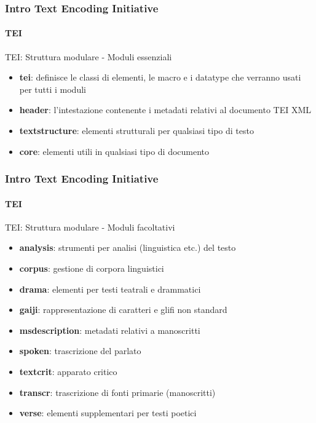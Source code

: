 \begin{frame}
	\frametitle{Intro Text Encoding Initiative}
	\framesubtitle{TEI}
	\addtocounter{nframe}{1}

	\begin{block}{TEI: Struttura modulare - Moduli essenziali}
		\begin{itemize}
			\item \textbf{tei}: definisce le classi di elementi, le macro e i datatype che verranno usati per tutti i moduli
			\item \textbf{header}: l’intestazione contenente i metadati relativi al documento TEI XML
			\item \textbf{textstructure}: elementi strutturali per qualsiasi tipo di testo
			\item \textbf{core}: elementi utili in qualsiasi tipo di documento
		\end{itemize}

	\end{block}

\end{frame}

\begin{frame}
	\frametitle{Intro Text Encoding Initiative}
	\framesubtitle{TEI}
	\addtocounter{nframe}{1}

	\begin{block}{TEI: Struttura modulare - Moduli facoltativi}
		\begin{itemize}
			\item \textbf{analysis}: strumenti per analisi (linguistica etc.) del testo
			\item \textbf{corpus}: gestione di corpora linguistici
			\item \textbf{drama}: elementi per testi teatrali e drammatici
			\item \textbf{gaiji}: rappresentazione di caratteri e glifi non standard
			\item \textbf{msdescription}: metadati relativi a manoscritti
			\item \textbf{spoken}: trascrizione del parlato
			\item \textbf{textcrit}: apparato critico
			\item \textbf{transcr}:  trascrizione di fonti primarie (manoscritti)
			\item \textbf{verse}: elementi supplementari per testi poetici
		\end{itemize}

	\end{block}

\end{frame}

